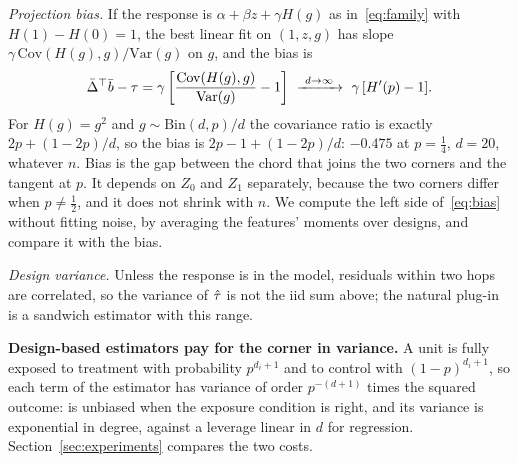 \emph{Projection bias.} If the response is $\alpha+\beta z+\gamma H(g)$ as in~\eqref{eq:family} with $H(1)-H(0)=1$, the best linear fit on $(1,z,g)$ has slope $\gamma\,\mathrm{Cov}(H(g),g)/\mathrm{Var}(g)$ on $g$, and the bias is
\begin{equation}
\bar\Delta^{\top}\bar b-\gate=\gamma\left[\frac{\mathrm{Cov}(H(g),g)}{\mathrm{Var}(g)}-1\right]\ \xrightarrow{\ d\to\infty\ }\ \gamma\,[H'(p)-1].\label{eq:bias}
\end{equation}
For $H(g)=g^2$ and $g\sim\mathrm{Bin}(d,p)/d$ the covariance ratio is exactly $2p+(1-2p)/d$, so the bias is $2p-1+(1-2p)/d$: $-0.475$ at $p=\tfrac14$, $d=20$, whatever $n$.
Bias is the gap between the chord that joins the two corners and the tangent at $p$. It depends on $Z_0$ and $Z_1$ separately, because the two corners differ when $p\neq\tfrac12$, and it does not shrink with $n$.
We compute the left side of~\eqref{eq:bias} without fitting noise, by averaging the features' moments over designs, and compare it with the bias.

\emph{Design variance.} Unless the response is in the model, residuals within two hops are correlated, so the variance of $\hat\tau$ is not the iid sum above; the natural plug-in is a sandwich estimator with this range.

\textbf{Design-based estimators pay for the corner in variance.}
A unit is fully exposed to treatment with probability $p^{d_i+1}$ and to control with $(1-p)^{d_i+1}$, so each term of the  estimator has variance of order $p^{-(d+1)}$ times the squared outcome:  is unbiased when the exposure condition is right, and its variance is exponential in degree, against a leverage linear in $d$ for regression. Section~\ref{sec:experiments} compares the two costs.
